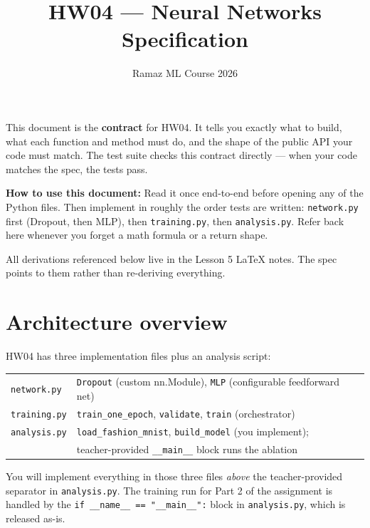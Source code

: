 \documentclass[11pt]{article}
\title{HW04 --- Neural Networks\\\large Specification}
\author{Ramaz ML Course 2026}
\date{}
\newcommand{\code}[1]{\texttt{\small #1}}
\begin{document}
\maketitle

\noindent
This document is the \textbf{contract} for HW04. It tells you exactly what to
build, what each function and method must do, and the shape of the public API
your code must match. The test suite checks this contract directly --- when
your code matches the spec, the tests pass.

\medskip
\noindent
\textbf{How to use this document:} Read it once end-to-end before opening
any of the Python files. Then implement in roughly the order tests are
written: \code{network.py} first (Dropout, then MLP), then
\code{training.py}, then \code{analysis.py}. Refer back here whenever you
forget a math formula or a return shape.

\medskip
\noindent
All derivations referenced below live in the Lesson 5 LaTeX notes. The spec
points to them rather than re-deriving everything.

\tableofcontents

\section{Architecture overview}

HW04 has three implementation files plus an analysis script:

\begin{center}
\begin{tabular}{ll}
\code{network.py}  & \code{Dropout} (custom nn.Module), \code{MLP} (configurable feedforward net) \\
\code{training.py} & \code{train\_one\_epoch}, \code{validate}, \code{train} (orchestrator) \\
\code{analysis.py} & \code{load\_fashion\_mnist}, \code{build\_model} (you implement);\\
                   & teacher-provided \code{\_\_main\_\_} block runs the ablation
\end{tabular}
\end{center}

\medskip
\noindent
You will implement everything in those three files \emph{above} the
teacher-provided separator in \code{analysis.py}. The training run for Part 2
of the assignment is handled by the \code{if \_\_name\_\_ == "\_\_main\_\_":}
block in \code{analysis.py}, which is released as-is.
\end{document}
